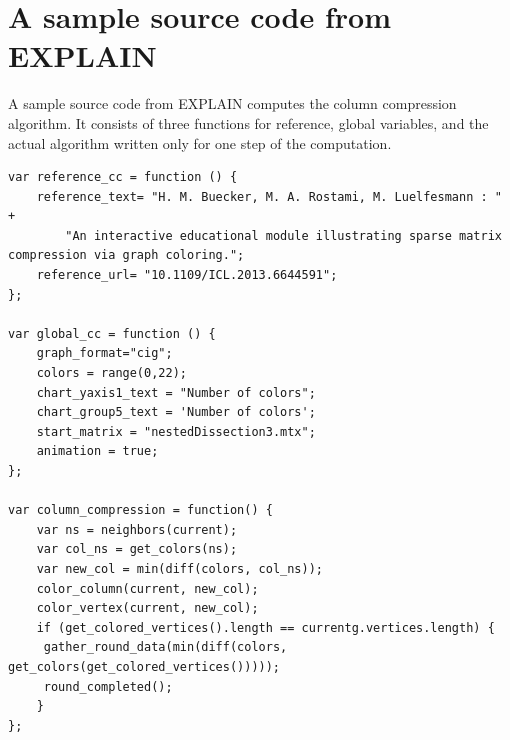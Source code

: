\documentclass[12pt, twoside,a4paper,toc=bibliography]{scrbook}
\begin{document}
\chapter{A sample source code from EXPLAIN}
\label{app.source}
A sample source code from EXPLAIN computes the column compression algorithm.
It consists of three functions for reference, global variables, and the actual algorithm
written only for one step of the computation.
\begin{lstlisting}
var reference_cc = function () {
    reference_text= "H. M. Buecker, M. A. Rostami, M. Luelfesmann : " +
        "An interactive educational module illustrating sparse matrix compression via graph coloring.";
    reference_url= "10.1109/ICL.2013.6644591";
};

var global_cc = function () {
    graph_format="cig";
    colors = range(0,22);
    chart_yaxis1_text = "Number of colors";
    chart_group5_text = 'Number of colors';
    start_matrix = "nestedDissection3.mtx";
    animation = true;
};

var column_compression = function() {
    var ns = neighbors(current);
    var col_ns = get_colors(ns);
    var new_col = min(diff(colors, col_ns));
    color_column(current, new_col);
    color_vertex(current, new_col);
    if (get_colored_vertices().length == currentg.vertices.length) {
     gather_round_data(min(diff(colors, get_colors(get_colored_vertices()))));
     round_completed();
    }
};
\end{lstlisting}
\end{document}
